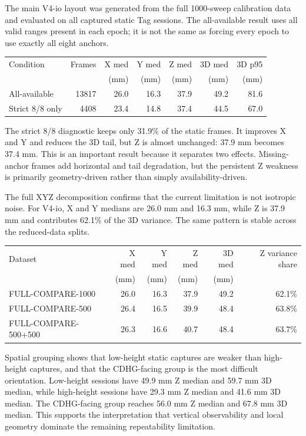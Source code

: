 \documentclass[11pt]{article}
\begin{document}
The main V4-io layout was generated from the full 1000-sweep calibration data and evaluated on all captured static Tag sessions. The all-available result uses all valid ranges present in each epoch; it is not the same as forcing every epoch to use exactly all eight anchors.

\begin{center}
\small
\begin{tabular}{l r r r r r r}
\toprule
Condition & Frames & X med & Y med & Z med & 3D med & 3D p95 \\
 & & (mm) & (mm) & (mm) & (mm) & (mm) \\
\midrule
All-available & 13817 & 26.0 & 16.3 & 37.9 & 49.2 & 81.6 \\
Strict 8/8 only & 4408 & 23.4 & 14.8 & 37.4 & 44.5 & 67.0 \\
\bottomrule
\end{tabular}
\end{center}

The strict 8/8 diagnostic keeps only 31.9\% of the static frames. It improves X and Y and reduces the 3D tail, but Z is almost unchanged: 37.9 mm becomes 37.4 mm. This is an important result because it separates two effects. Missing-anchor frames add horizontal and tail degradation, but the persistent Z weakness is primarily geometry-driven rather than simply availability-driven.

The full XYZ decomposition confirms that the current limitation is not isotropic noise. For V4-io, X and Y medians are 26.0 mm and 16.3 mm, while Z is 37.9 mm and contributes 62.1\% of the 3D variance. The same pattern is stable across the reduced-data splits.

\begin{center}
\small
\begin{tabular}{l r r r r r}
\toprule
Dataset & X med & Y med & Z med & 3D med & Z variance share \\
 & (mm) & (mm) & (mm) & (mm) & \\
\midrule
FULL-COMPARE-1000 & 26.0 & 16.3 & 37.9 & 49.2 & 62.1\% \\
FULL-COMPARE-500 & 26.4 & 16.5 & 39.9 & 48.4 & 63.8\% \\
FULL-COMPARE-500+500 & 26.3 & 16.6 & 40.7 & 48.4 & 63.7\% \\
\bottomrule
\end{tabular}
\end{center}

Spatial grouping shows that low-height static captures are weaker than high-height captures, and that the CDHG-facing group is the most difficult orientation. Low-height sessions have 49.9 mm Z median and 59.7 mm 3D median, while high-height sessions have 29.3 mm Z median and 41.6 mm 3D median. The CDHG-facing group reaches 56.0 mm Z median and 67.8 mm 3D median. This supports the interpretation that vertical observability and local geometry dominate the remaining repeatability limitation.
\end{document}
